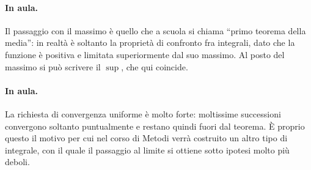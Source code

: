 \paragraph{In aula.} Il passaggio con il massimo è quello che a scuola si chiama
``primo teorema della media'': in realtà è soltanto la proprietà di confronto fra
integrali, dato che la funzione è positiva e limitata superiormente dal suo massimo.
Al posto del massimo si può scrivere il $\sup$, che qui coincide.

\paragraph{In aula.} La richiesta di convergenza uniforme è molto forte: moltissime
successioni convergono soltanto puntualmente e restano quindi fuori dal teorema. È
proprio questo il motivo per cui nel corso di Metodi verrà costruito un altro tipo di
integrale, con il quale il passaggio al limite si ottiene sotto ipotesi molto più
deboli.
